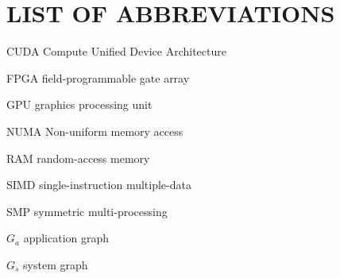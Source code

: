 \documentclass[tocnosub,noragright,centerchapter,12pt]{uiucecethesis09}
\begin{document}
%
\chapter{LIST OF ABBREVIATIONS}

\begin{symbollist*}
	\item[CUDA] Compute Unified Device Architecture
	\item[FPGA] field-programmable gate array
	\item[GPU] graphics processing unit
	\item[NUMA] Non-uniform memory access
	\item[RAM] random-access memory
	\item[SIMD] single-instruction multiple-data
	\item[SMP] symmetric multi-processing
\end{symbollist*}


%
\begin{symbollist}[0.7in]
	\item[$G_a$] application graph
	\item[$G_s$] system graph
\end{symbollist}

\mainmatter

%










%
\appendix
\begin{appendices}
	
\end{appendices}

\backmatter

%





\end{document}
